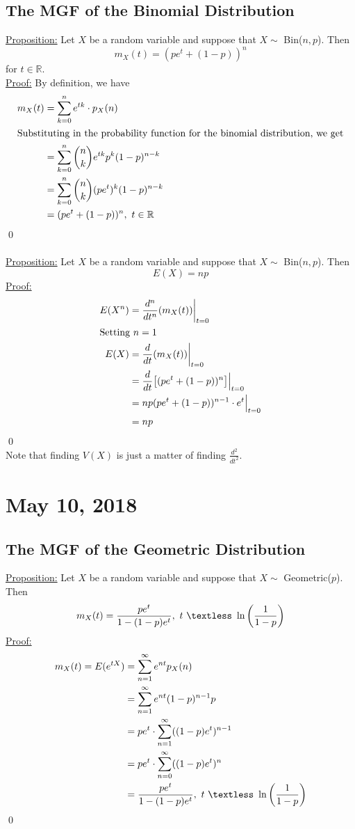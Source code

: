 \documentclass{article}
\newcommand{\R}{\mathbb{R}}
\newcommand{\lt}{\textless}
\newcommand{\x}{\cdot}
\begin{document}
\subsection{The MGF of the Binomial Distribution}
\underline{Proposition:} Let $X$ be a random variable and suppose that $X \sim$ Bin($n, p$). Then
\[m_{X}(t) = (pe^{t} + (1-p))^{n}\]
for $t \in \R$.\\
\underline{Proof:} By definition, we have
\begin{align*}
	m_{X}(t) &= \sum_{k=0}^{n} e^{tk}\x p_{X}(n)\\
	\intertext{Substituting in the probability function for the binomial distribution, we get}
			&= \sum_{k=0}^{n} {n\choose k} e^{tk}p^{k}(1-p)^{n-k}\\
			&= \sum_{k=0}^{n} {n\choose k} (pe^{t})^{k}(1-p)^{n-k}\\
			&= (pe^{t} + (1-p))^{n}, \ t\in \R
\end{align*}
\qed \\\\
\underline{Proposition:} Let $X$ be a random variable and suppose that $X \sim$ Bin($n, p$). Then
\[E(X) = np\]
\underline{Proof:} 
\begin{align*}
	E(X^{n}) &= \frac{d^{n}}{dt^{n}}(m_{X}(t))\bigg\rvert_{t=0}\\
	\intertext{Setting $n=1$}
	E(X) &= \frac{d}{dt}(m_{X}(t))\bigg\rvert_{t=0}\\
		&= \frac{d}{dt}\big[(pe^{t} + (1-p))^{n}\big] \Big\rvert_{t=0}\\
		&= np(pe^{t} + (1-p))^{n-1}\x e^{t} \Big\rvert_{t=0}\\
		&= np
\end{align*}
\qed\\
Note that finding $V(X)$ is just a matter of finding $\frac{d^{2}}{dt^{2}}$.
\newpage


\section{May 10, 2018}
\subsection{The MGF of the Geometric Distribution}
\underline{Proposition:} Let $X$ be a random variable and suppose that $X \sim$ Geometric($p$). Then
\[m_{X}(t) = \frac{pe^{t}}{1-(1-p)e^{t}}, \ t\ \lt\ \ln\bigg(\frac{1}{1-p}\bigg)\]
\underline{Proof:}
\begin{align*}
	m_{X}(t) = E(e^{tX}) &= \sum_{n=1}^{\infty} e^{nt}p_{X}(n)\\
					&= \sum_{n=1}^{\infty} e^{nt}(1-p)^{n-1}p\\
					&= pe^{t}\x \sum_{n=1}^{\infty} ((1-p)e^{t})^{n-1}\\
					&= pe^{t}\x \sum_{n=0}^{\infty} ((1-p)e^{t})^{n}\\
					 &= \frac{pe^{t}}{1-(1-p)e^{t}}, \ t\ \lt\ \ln\bigg(\frac{1}{1-p}\bigg)
\end{align*}
\qed
\end{document}
